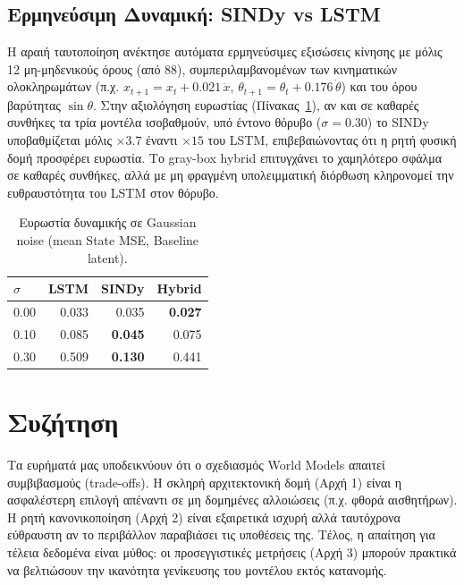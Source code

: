 \documentclass[conference, a4paper]{IEEEtran}
\begin{document}
\subsection{\textbf{Ερμηνεύσιμη Δυναμική: \textlatin{SINDy} vs \textlatin{LSTM}}}
Η αραιή ταυτοποίηση ανέκτησε αυτόματα ερμηνεύσιμες εξισώσεις κίνησης με μόλις 12 μη-μηδενικούς όρους (από 88), συμπεριλαμβανομένων των κινηματικών ολοκληρωμάτων (π.χ. $x_{t+1}=x_t+0.021\,\dot{x}$, $\theta_{t+1}=\theta_t+0.176\,\dot{\theta}$) και του όρου βαρύτητας $\sin\theta$. Στην αξιολόγηση ευρωστίας (Πίνακας~\ref{tab:sindy}), αν και σε καθαρές συνθήκες τα τρία μοντέλα ισοβαθμούν, υπό έντονο θόρυβο ($\sigma=0.30$) το \textlatin{SINDy} υποβαθμίζεται μόλις $\times 3.7$ έναντι $\times 15$ του \textlatin{LSTM}, επιβεβαιώνοντας ότι η ρητή φυσική δομή προσφέρει ευρωστία. Το \textlatin{gray-box hybrid} επιτυγχάνει το χαμηλότερο σφάλμα σε καθαρές συνθήκες, αλλά με μη φραγμένη υπολειμματική διόρθωση κληρονομεί την ευθραυστότητα του \textlatin{LSTM} στον θόρυβο.

\begin{table}[h]
\centering
\caption{Ευρωστία δυναμικής σε \textlatin{Gaussian noise} (\textlatin{mean State MSE}, \textlatin{Baseline} latent).}
\label{tab:sindy}
\small
\begin{tabular}{l r r r}
\toprule
$\sigma$ & \textlatin{LSTM} & \textlatin{SINDy} & \textlatin{Hybrid} \\
\midrule
0.00 & 0.033 & 0.035 & \textbf{0.027} \\
0.10 & 0.085 & \textbf{0.045} & 0.075 \\
0.30 & 0.509 & \textbf{0.130} & 0.441 \\
\bottomrule
\end{tabular}
\end{table}

\section{\textbf{Συζήτηση}}
\label{sec:discussion}
Τα ευρήματά μας υποδεικνύουν ότι ο σχεδιασμός \textlatin{World Models} απαιτεί συμβιβασμούς (\textlatin{trade-offs}). Η σκληρή αρχιτεκτονική δομή (Αρχή 1) είναι η ασφαλέστερη επιλογή απέναντι σε μη δομημένες αλλοιώσεις (π.χ. φθορά αισθητήρων). Η ρητή κανονικοποίηση (Αρχή 2) είναι εξαιρετικά ισχυρή αλλά ταυτόχρονα εύθραυστη αν το περιβάλλον παραβιάσει τις υποθέσεις της. Τέλος, η απαίτηση για τέλεια δεδομένα είναι μύθος: οι προσεγγιστικές μετρήσεις (Αρχή 3) μπορούν πρακτικά να βελτιώσουν την ικανότητα γενίκευσης του μοντέλου εκτός κατανομής.
\end{document}
